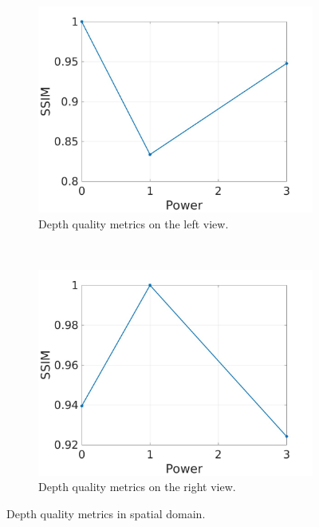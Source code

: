 \begin{figure}[h!]
    \centering
    \begin{subfigure}[t]{0.5\textwidth}
        \centering
\includegraphics[width=1\textwidth]{./img/qm_gauss/gqm_ldisp.jpg}
          \caption{\small{Depth quality metrics on the left view.}}
\label{fig:gqmcr}

    \end{subfigure}%
    ~ 
    \begin{subfigure}[t]{0.5\textwidth}
        \centering
\includegraphics[width=1\textwidth]{./img/qm_gauss/gqm_rdisp.jpg}
           \caption{\small{Depth quality metrics on the right view.}}
\label{fig:gqmdr}
    \end{subfigure}
    \caption{Depth quality metrics in spatial domain. }
        \label{fig:gqmd}
\end{figure}

